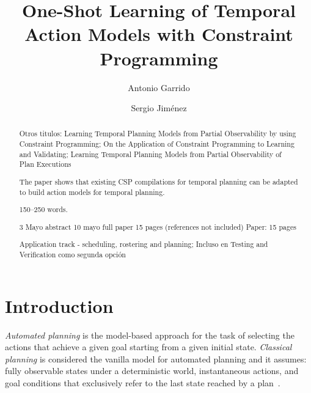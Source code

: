 \documentclass[runningheads]{llncs}
\begin{document}
\title{One-Shot Learning of Temporal Action Models with Constraint Programming}


%
\author{Antonio Garrido \and Sergio Jim\'enez}

%

\maketitle              %

\begin{abstract}
Otros titulos:  Learning Temporal Planning Models from Partial Observability by using Constraint Programming; On the Application of Constraint Programming to Learning and Validating;
Learning Temporal Planning Models from Partial Observability of Plan Executions

The paper shows that existing CSP compilations for temporal planning can be adapted to build action models for temporal planning.


150--250 words.

3 Mayo abstract
10 mayo full paper 15 pages (references not included)
Paper: 15 pages

Application track - scheduling, rostering and planning;
Incluso en Testing and Verification como segunda opción

\end{abstract}


\section{Introduction}
\label{sec:introduction}

{\em Automated planning} is the model-based approach for the task of selecting the actions that achieve a given goal starting from a given initial state. {\em Classical planning} is considered the vanilla model for automated planning and it assumes: fully observable states under a deterministic world, instantaneous actions, and goal conditions that exclusively refer to the last state reached by a plan~\cite{geffner2013concise,ghallab2004automated}.
\end{document}
